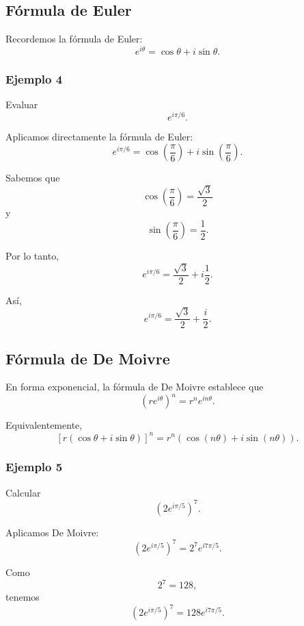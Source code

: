\documentclass[12pt]{article}
\begin{document}
\subsection{Fórmula de Euler}

Recordemos la fórmula de Euler:
\[
\boxed{e^{i\theta}=\cos\theta+i\sin\theta}.
\]

\subsubsection*{Ejemplo 4}

Evaluar
\[
e^{i\pi/6}.
\]

Aplicamos directamente la fórmula de Euler:
\[
e^{i\pi/6}
=
\cos\left(\frac{\pi}{6}\right)
+
i\sin\left(\frac{\pi}{6}\right).
\]

Sabemos que
\[
\cos\left(\frac{\pi}{6}\right)
=
\frac{\sqrt{3}}{2}
\]
y
\[
\sin\left(\frac{\pi}{6}\right)
=
\frac{1}{2}.
\]

Por lo tanto,
\[
e^{i\pi/6}
=
\frac{\sqrt{3}}{2}
+
i\frac{1}{2}.
\]

Así,
\[
\boxed{
e^{i\pi/6}
=
\frac{\sqrt{3}}{2}+\frac{i}{2}
}.
\]

\subsection{Fórmula de De Moivre}

En forma exponencial, la fórmula de De Moivre establece que
\[
\boxed{
\left(re^{i\theta}\right)^n
=
r^n e^{in\theta}
}.
\]

Equivalentemente,
\[
\left[r(\cos\theta+i\sin\theta)\right]^n
=
r^n\left(
\cos(n\theta)+i\sin(n\theta)
\right).
\]

\subsubsection*{Ejemplo 5}

Calcular
\[
\left(2e^{i\pi/5}\right)^7.
\]

Aplicamos De Moivre:
\[
\left(2e^{i\pi/5}\right)^7
=
2^7e^{i7\pi/5}.
\]

Como
\[
2^7=128,
\]
tenemos
\[
\left(2e^{i\pi/5}\right)^7
=
128e^{i7\pi/5}.
\]
\end{document}
